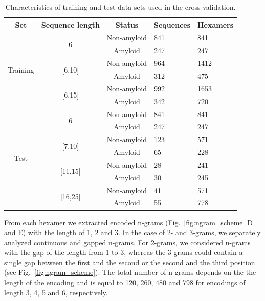 \documentclass[fleqn,10pt,twoside]{gcb15submission}
\begin{document}
\begin{table}
\centering
\small
\caption{Characteristics of training and test data sets used in the 
cross-validation.}
\label{tab:data_sets}
\begin{tabular}{cccll}
\toprule
Set & Sequence length & Status & Sequences & Hexamers \\ 
\midrule
\multirow{6}{*}{Training} & \multirow{2}{*}{6} & Non-amyloid & 841 & 841 
\\
 &  & \cellcolor[gray]{0.85}Amyloid & \cellcolor[gray]{0.85}247 & 
\cellcolor[gray]{0.85}247 \\
 \cline{2-5}
 & \multirow{2}{*}{{[}6,10{]}} & Non-amyloid & 964 & 1412 \\
 &  & \cellcolor[gray]{0.85}Amyloid & \cellcolor[gray]{0.85}312 & 
\cellcolor[gray]{0.85}475 \\
 \cline{2-5}
 & \multirow{2}{*}{{[}6,15{]}} & Non-amyloid & 992 & 1653 \\
 &  & \cellcolor[gray]{0.85}Amyloid & \cellcolor[gray]{0.85}342 & 
\cellcolor[gray]{0.85}720 \\
 \hline
 \hline
\multirow{8}{*}{Test} & \multirow{2}{*}{6} & Non-amyloid & 841 & 841 \\
 &  & \cellcolor[gray]{0.85}Amyloid & \cellcolor[gray]{0.85}247 & 
\cellcolor[gray]{0.85}247 \\
 \cline{2-5}
 & \multirow{2}{*}{{[}7,10{]}} & Non-amyloid & 123 & 571 \\
 &  & \cellcolor[gray]{0.85}Amyloid & \cellcolor[gray]{0.85}65 & 
\cellcolor[gray]{0.85}228 \\
 \cline{2-5}
 & \multirow{2}{*}{{[}11,15{]}} & Non-amyloid & 28 & 241 \\
 &  & \cellcolor[gray]{0.85}Amyloid & \cellcolor[gray]{0.85}30 & 
\cellcolor[gray]{0.85}245 \\
 \cline{2-5}
 & \multirow{2}{*}{{[}16,25{]}} & Non-amyloid & 41 & 571 \\
 &  & \cellcolor[gray]{0.85}Amyloid & \cellcolor[gray]{0.85}55 & 
\cellcolor[gray]{0.85}778 \\
 \bottomrule
\end{tabular}
\end{table}

  From each hexamer we extracted encoded n-grams (Fig.~\ref{fig:ngram_scheme} D and E) with 
the length of 1, 2 and 3. In the case of 2- and 3-grams, we separately analyzed 
continuous and gapped n-grams. 
For 2-grams, we considered n-grams with the gap of the length from 1 to 3, 
whereas the 3-grams could contain a single gap between the first and the second 
or the second and the third position (see Fig.~\ref{fig:ngram_scheme}). The 
total number of n-grams depends on the the length of the encoding and is equal 
to 120, 260, 480 and 798 for encodings of length 3, 4, 5 and 6, respectively.
\end{document}
